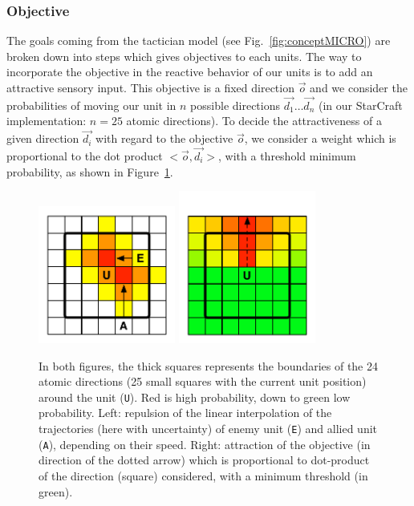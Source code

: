\subsubsection{Objective}
The goals coming from the tactician model (see Fig.~\ref{fig:conceptMICRO}) are broken down into steps which gives objectives to each units. The way to incorporate the objective in the reactive behavior of our units is to add an attractive sensory input. This objective is a fixed direction $\vec{o}$ and we consider the probabilities of moving our unit in $n$ possible directions $\vec{d_1} \dots \vec{d_n}$ (in our StarCraft implementation: $n=25$ atomic directions). To decide the attractiveness of a given direction $\vec{d_i}$ with regard to the objective $\vec{o}$, we consider a weight which is proportional to the dot product $<\vec{o},\vec{d_i}>$, with a threshold minimum probability, as shown in Figure~\ref{fig:BayesianUnit_perceptions}.

\begin{figure}[h]
\begin{center}
\includegraphics[width=4.5cm]{images/repulsion_units_interpolation.pdf}
\hspace{1cm}
\includegraphics[width=4.5cm]{images/obj_Bayesian_units.pdf}
\caption{In both figures, the thick squares represents the boundaries of the 24 atomic directions (25 small squares with the current unit position) around the unit (\texttt{U}). Red is high probability, down to green low probability. Left: repulsion of the linear interpolation of the trajectories (here with uncertainty) of enemy unit (\texttt{E}) and allied unit (\texttt{A}), depending on their speed. Right: attraction of the objective (in direction of the dotted arrow) which is proportional to dot-product of the direction (square) considered, with a minimum threshold (in green).}
\label{fig:BayesianUnit_perceptions}
\end{center}
\end{figure}


